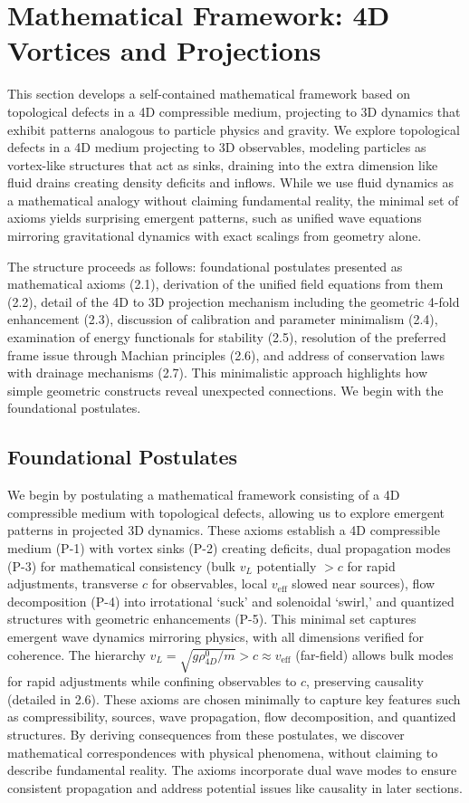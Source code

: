 \section{Mathematical Framework: 4D Vortices and Projections}

This section develops a self-contained mathematical framework based on topological defects in a 4D compressible medium, projecting to 3D dynamics that exhibit patterns analogous to particle physics and gravity. We explore topological defects in a 4D medium projecting to 3D observables, modeling particles as vortex-like structures that act as sinks, draining into the extra dimension like fluid drains creating density deficits and inflows. While we use fluid dynamics as a mathematical analogy without claiming fundamental reality, the minimal set of axioms yields surprising emergent patterns, such as unified wave equations mirroring gravitational dynamics with exact scalings from geometry alone.

The structure proceeds as follows: foundational postulates presented as mathematical axioms (2.1), derivation of the unified field equations from them (2.2), detail of the 4D to 3D projection mechanism including the geometric 4-fold enhancement (2.3), discussion of calibration and parameter minimalism (2.4), examination of energy functionals for stability (2.5), resolution of the preferred frame issue through Machian principles (2.6), and address of conservation laws with drainage mechanisms (2.7). This minimalistic approach highlights how simple geometric constructs reveal unexpected connections. We begin with the foundational postulates.

\subsection{Foundational Postulates}

We begin by postulating a mathematical framework consisting of a 4D compressible medium with topological defects, allowing us to explore emergent patterns in projected 3D dynamics. These axioms establish a 4D compressible medium (P-1) with vortex sinks (P-2) creating deficits, dual propagation modes (P-3) for mathematical consistency (bulk $v_L$ potentially $>c$ for rapid adjustments, transverse $c$ for observables, local $v_{\text{eff}}$ slowed near sources), flow decomposition (P-4) into irrotational `suck' and solenoidal `swirl,' and quantized structures with geometric enhancements (P-5). This minimal set captures emergent wave dynamics mirroring physics, with all dimensions verified for coherence. The hierarchy $v_L = \sqrt{g \rho_{4D}^0 / m} > c \approx v_{\text{eff}}$ (far-field) allows bulk modes for rapid adjustments while confining observables to $c$, preserving causality (detailed in 2.6). These axioms are chosen minimally to capture key features such as compressibility, sources, wave propagation, flow decomposition, and quantized structures. By deriving consequences from these postulates, we discover mathematical correspondences with physical phenomena, without claiming to describe fundamental reality. The axioms incorporate dual wave modes to ensure consistent propagation and address potential issues like causality in later sections.

